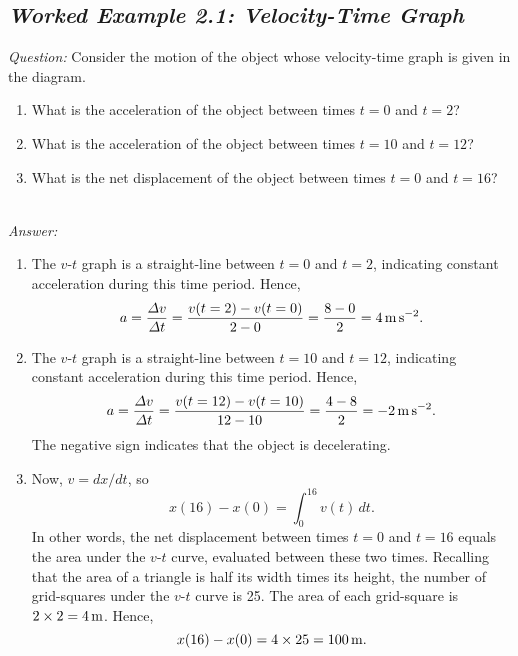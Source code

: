 \subsection*{\em Worked Example 2.1: Velocity-Time Graph}
\begin{figure*}[h]
\epsfysize=3in
\centerline{}
\end{figure*}
{\em Question:} Consider the motion of the object whose velocity-time
graph is given in the diagram.
\begin{enumerate}
\item What is the acceleration of the object between times $t=0$ and $t=2$?
\item What is the acceleration of the object between times $t=10$ and $t=12$?
\item What is the net displacement of the object between times $t=0$ and
$t=16$?
\end{enumerate}
~\\
{\em Answer:}
\begin{enumerate}
\item The $v$-$t$ graph is a straight-line between $t=0$ and $t=2$, indicating 
constant acceleration during this time period. Hence,
$$
a = \frac{{\mit\Delta}v}{{\mit\Delta} t} = \frac{v(t=2)-v(t=0)}{2-0} = 
\frac{8-0}{2} = 4\,{\rm m\,s^{-2}}.
$$
\item The $v$-$t$ graph is a straight-line between $t=10$ and $t=12$, indicating 
constant acceleration during this time period. Hence,
$$
a = \frac{{\mit\Delta}v}{{\mit\Delta} t} = \frac{v(t=12)-v(t=10)}{12-10} = 
\frac{4-8}{2} = -2\,{\rm m\,s^{-2}}.
$$
The negative sign indicates that the object is decelerating.
\item Now, $v=dx/dt$, so
$$
x(16)-x(0) = \int_0^{16} v(t)\,dt.
$$
In other words, the net displacement between times $t=0$ and $t=16$ equals
the area under the $v$-$t$ curve, evaluated  between these two times. Recalling that the
area of a triangle is half its width times its height, the number of grid-squares
under the $v$-$t$ curve is 25. The area of each grid-square is $2\times 2=4\,{\rm m}$.
Hence,
$$
x(16)-x(0) = 4\times 25 = 100\,{\rm m}.
$$
\end{enumerate}

